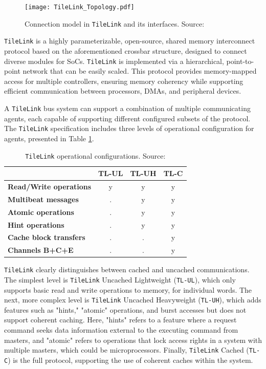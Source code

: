 \begin{figure}[h!]
    \centering
    \texttt{[image: TileLink\_Topology.pdf]}
    \caption{Connection model in \texttt{TileLink} and its interfaces. Source: \cite{sifive2018tilelink}}
    \label{fig:tilelink_connection_model}
\end{figure}

\texttt{TileLink} is a highly parameterizable, open-source, shared memory interconnect protocol based on the aforementioned crossbar structure, designed to connect diverse modules for SoCs. \texttt{TileLink} is implemented via a hierarchical, point-to-point network that can be easily scaled. This protocol provides memory-mapped access for multiple controllers, ensuring memory coherency while supporting efficient communication between processors, DMAs, and peripheral devices.

A \texttt{TileLink} bus system can support a combination of multiple communicating agents, each capable of supporting different configured subsets of the protocol. The \texttt{TileLink} specification includes three levels of operational configuration for agents, presented in Table \ref{tab:tilelink_configs}.

\begin{table}[h!]
\centering
\caption{\texttt{TileLink} operational configurations. Source: \cite{sifive2018tilelink}}
\label{tab:tilelink_configs}
\begin{tabular}{|l|c|c|c|}
\hline
 & \textbf{TL-UL} & \textbf{TL-UH} & \textbf{TL-C} \\
\hline
\textbf{Read/Write operations} & y & y & y \\
\textbf{Multibeat messages} & . & y & y \\
\textbf{Atomic operations} & . & y & y \\
\textbf{Hint operations} & . & y & y \\
\textbf{Cache block transfers} & . & . & y \\
\textbf{Channels B+C+E} & . & . & y \\
\hline
\end{tabular}
\end{table}

\texttt{TileLink} clearly distinguishes between cached and uncached communications. The simplest level is \texttt{TileLink} Uncached Lightweight (\texttt{TL-UL}), which only supports basic read and write operations to memory, for individual words. The next, more complex level is \texttt{TileLink} Uncached Heavyweight (\texttt{TL-UH}), which adds features such as "hints," "atomic" operations, and burst accesses but does not support coherent caching. Here, "hints" refers to a feature where a request command seeks data information external to the executing command from masters, and "atomic" refers to operations that lock access rights in a system with multiple masters, which could be microprocessors. Finally, \texttt{TileLink} Cached (\texttt{TL-C}) is the full protocol, supporting the use of coherent caches within the system.

